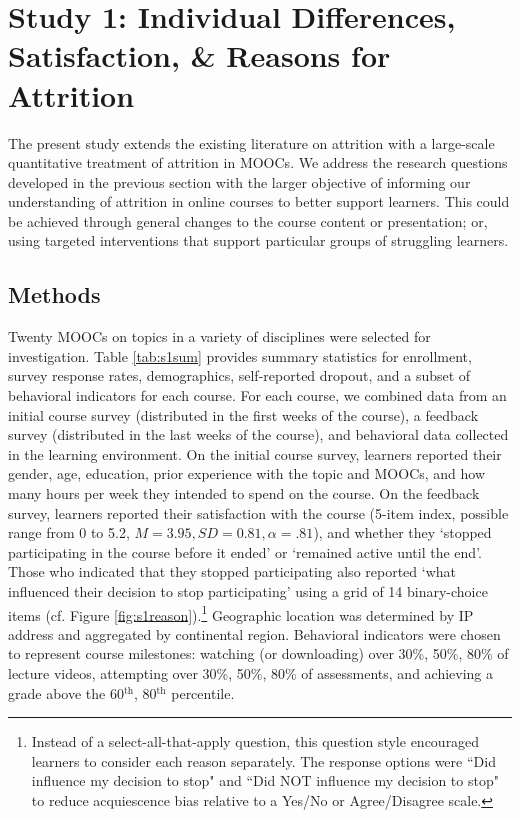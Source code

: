 \documentclass{sigchi}\usepackage[]{graphicx}\usepackage[]{color}
\begin{document}
\section{Study 1: Individual Differences, Satisfaction, \& Reasons for Attrition}

The present study extends the existing literature on attrition with a large-scale quantitative treatment of attrition in MOOCs. We address the research questions developed in the previous section with the larger objective of informing our understanding of attrition in online courses to better support learners. This could be achieved through general changes to the course content or presentation; or, using targeted interventions that support particular groups of struggling learners.

\subsection{Methods}

Twenty MOOCs on topics in a variety of disciplines were selected for investigation. Table \ref{tab:s1sum} provides summary statistics for enrollment, survey response rates, demographics, self-reported dropout, and a subset of behavioral indicators for each course. For each course, we combined data from an initial course survey (distributed in the first weeks of the course), a feedback survey (distributed in the last weeks of the course), and behavioral data collected in the learning environment. On the initial course survey, learners reported their gender, age, education, prior experience with the topic and MOOCs, and how many hours per week they intended to spend on the course. On the feedback survey, learners reported their satisfaction with the course (5-item index, possible range from 0 to 5.2, $M=3.95, SD=0.81, \alpha=.81$), and whether they `stopped participating in the course before it ended' or `remained active until the end'. Those who indicated that they stopped participating also reported `what influenced their decision to stop participating' using a grid of 14 binary-choice items (cf. Figure \ref{fig:s1reason}).\footnote{Instead of a select-all-that-apply question, this question style encouraged learners to consider each reason separately. The response options were ``Did influence my decision to stop" and ``Did NOT influence my decision to stop" to reduce acquiescence bias relative to a Yes/No or Agree/Disagree scale.} Geographic location was determined by IP address and aggregated by continental region. Behavioral indicators were chosen to represent course milestones: watching (or downloading) over 30\%, 50\%, 80\% of lecture videos, attempting over 30\%, 50\%, 80\% of assessments, and achieving a grade above the 60$^\text{th}$, 80$^\text{th}$ percentile. 
\end{document}
